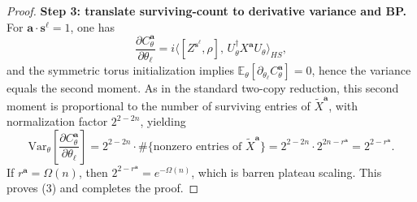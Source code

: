 \documentclass[a4paper,onecolumn,notitlepage,nofootinbib,longbibliography,superscriptaddress, floatfix, pra, aps, 10pt]{revtex4-2}
\newcommand{\vttheta}{{\bm{\theta}}}
\newcommand{\vta}{{\bm{a}}}
\newcommand{\vtb}{{\bm{b}}}
\newcommand{\vtsj}{{\bm{s}^j}}
\newcommand{\vts}{{\bm{s}}}
\newtheorem{theorem}{Theorem}
\begin{document}
\begin{proof}
\textbf{Step 3: translate surviving-count to derivative variance and BP.}
For $\vta\cdot\vts^\ell=1$, one has
\[
\frac{\partial C^\vta_\theta}{\partial\theta_\ell}
=i\langle [Z^{\vts^\ell},\rho],\,U_\theta^\dagger X^\vta U_\theta\rangle_{HS},
\]
and the symmetric torus initialization implies
$\mathbb{E}_\theta[\partial_{\theta_\ell}C^\vta_\theta]=0$, hence the variance equals the second moment.
As in the standard two-copy reduction, this second moment is proportional to the number of surviving entries of $\widetilde X^\vta$,
with normalization factor $2^{2-2n}$, yielding
\[
\mathrm{Var}_{\theta}\!\left[\frac{\partial C^\vta_\theta}{\partial\theta_\ell}\right]
=2^{2-2n}\cdot \#\{\text{nonzero entries of }\widetilde X^\vta\}
=2^{2-2n}\cdot 2^{2n-r^\vta}
=2^{2-r^\vta}.
\]
If $r^\vta=\Omega(n)$, then $2^{2-r^\vta}=e^{-\Omega(n)}$, which is barren plateau scaling.
This proves (3) and completes the proof.
\end{proof}



\end{document}
